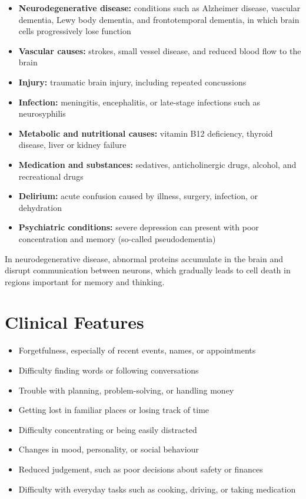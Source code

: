 \begin{itemize}
    \item \textbf{Neurodegenerative disease:} conditions such as Alzheimer disease, vascular dementia, Lewy body dementia, and frontotemporal dementia, in which brain cells progressively lose function
    \item \textbf{Vascular causes:} strokes, small vessel disease, and reduced blood flow to the brain
    \item \textbf{Injury:} traumatic brain injury, including repeated concussions
    \item \textbf{Infection:} meningitis, encephalitis, or late-stage infections such as neurosyphilis
    \item \textbf{Metabolic and nutritional causes:} vitamin B12 deficiency, thyroid disease, liver or kidney failure
    \item \textbf{Medication and substances:} sedatives, anticholinergic drugs, alcohol, and recreational drugs
    \item \textbf{Delirium:} acute confusion caused by illness, surgery, infection, or dehydration
    \item \textbf{Psychiatric conditions:} severe depression can present with poor concentration and memory (so-called pseudodementia)
\end{itemize}

In neurodegenerative disease, abnormal proteins accumulate in the brain and disrupt communication between neurons, which gradually leads to cell death in regions important for memory and thinking.

\section*{Clinical Features}
\begin{itemize}
    \item Forgetfulness, especially of recent events, names, or appointments
    \item Difficulty finding words or following conversations
    \item Trouble with planning, problem-solving, or handling money
    \item Getting lost in familiar places or losing track of time
    \item Difficulty concentrating or being easily distracted
    \item Changes in mood, personality, or social behaviour
    \item Reduced judgement, such as poor decisions about safety or finances
    \item Difficulty with everyday tasks such as cooking, driving, or taking medication
\end{itemize}

